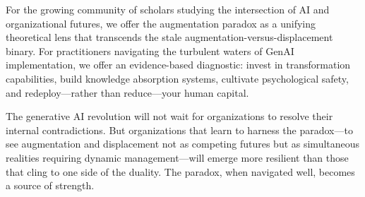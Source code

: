 \documentclass[12pt, a4paper]{article}
\begin{document}
For the growing community of scholars studying the intersection of AI and organizational futures, we offer the augmentation paradox as a unifying theoretical lens that transcends the stale augmentation-versus-displacement binary. For practitioners navigating the turbulent waters of GenAI implementation, we offer an evidence-based diagnostic: invest in transformation capabilities, build knowledge absorption systems, cultivate psychological safety, and redeploy---rather than reduce---your human capital.

The generative AI revolution will not wait for organizations to resolve their internal contradictions. But organizations that learn to harness the paradox---to see augmentation and displacement not as competing futures but as simultaneous realities requiring dynamic management---will emerge more resilient than those that cling to one side of the duality. The paradox, when navigated well, becomes a source of strength.



\end{document}
